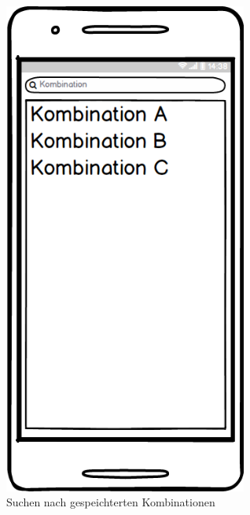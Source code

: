 \begin{figure}[ht]
	\centering
	\includegraphics[keepaspectratio,width=8cm]{img/Kombination_suchen}
	\caption{Suchen nach gespeichterten Kombinationen}
\end{figure}

